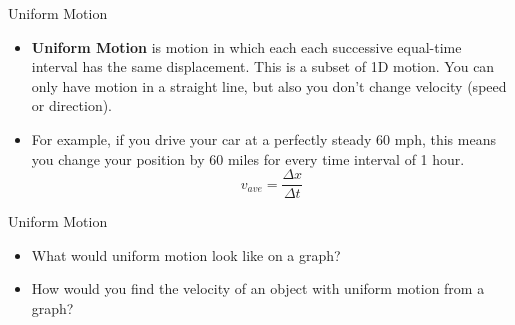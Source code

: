 \documentclass{beamer}
\begin{document}
\begin{frame}{Uniform Motion}
\begin{itemize}
   \item {\bf Uniform Motion} is motion in which each each successive equal-time interval has the same displacement. This is a subset of 1D motion. You can only have motion in a straight line, but also you don't change velocity (speed or direction).
   \item For example, if you drive your car at a perfectly steady 60 mph, this means you change your position by 60 miles for every time interval of 1 hour.
   \begin{equation*}
      v_{ave} = \frac{\Delta x}{\Delta t}
   \end{equation*}
\end{itemize}
\end{frame}

\begin{frame}{Uniform Motion}
\begin{itemize}
   \item<1-> What would uniform motion look like on a graph?
   \item<1-> How would you find the velocity of an object with uniform motion from a graph?\\~\\
\end{itemize}
\begin{center}
\end{center}
\end{frame}
\end{document}
